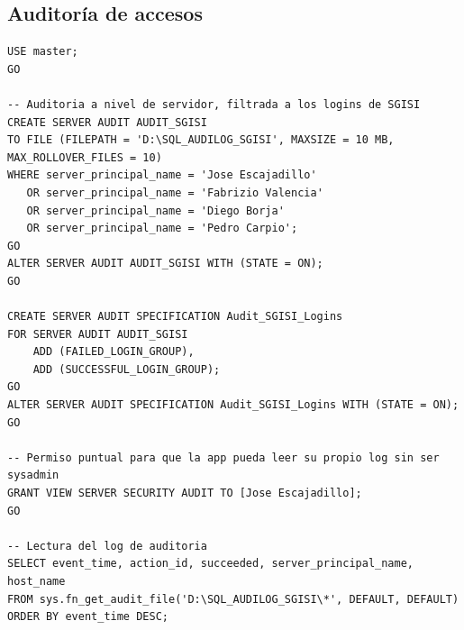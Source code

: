 \documentclass[11pt,a4paper]{article}
\begin{document}
\subsection{Auditoría de accesos}

\begin{lstlisting}
USE master;
GO

-- Auditoria a nivel de servidor, filtrada a los logins de SGISI
CREATE SERVER AUDIT AUDIT_SGISI
TO FILE (FILEPATH = 'D:\SQL_AUDILOG_SGISI', MAXSIZE = 10 MB, MAX_ROLLOVER_FILES = 10)
WHERE server_principal_name = 'Jose Escajadillo'
   OR server_principal_name = 'Fabrizio Valencia'
   OR server_principal_name = 'Diego Borja'
   OR server_principal_name = 'Pedro Carpio';
GO
ALTER SERVER AUDIT AUDIT_SGISI WITH (STATE = ON);
GO

CREATE SERVER AUDIT SPECIFICATION Audit_SGISI_Logins
FOR SERVER AUDIT AUDIT_SGISI
    ADD (FAILED_LOGIN_GROUP),
    ADD (SUCCESSFUL_LOGIN_GROUP);
GO
ALTER SERVER AUDIT SPECIFICATION Audit_SGISI_Logins WITH (STATE = ON);
GO

-- Permiso puntual para que la app pueda leer su propio log sin ser sysadmin
GRANT VIEW SERVER SECURITY AUDIT TO [Jose Escajadillo];
GO

-- Lectura del log de auditoria
SELECT event_time, action_id, succeeded, server_principal_name, host_name
FROM sys.fn_get_audit_file('D:\SQL_AUDILOG_SGISI\*', DEFAULT, DEFAULT)
ORDER BY event_time DESC;
\end{lstlisting}
\end{document}
